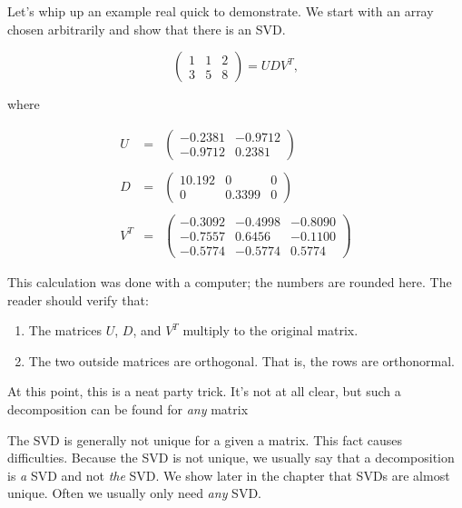 \documentclass{amsbook}
\begin{document}
\begin{tcolorbox}[title=Example,colback=blue!5]
Let's whip up an example real quick to demonstrate.  We start with an array chosen arbitrarily and show that there is an SVD.

$$
\left(
\begin{array}{ccc}
1 & 1 & 2 \\ 3 & 5 & 8
\end{array}
\right) = UDV^T,
$$

where

$$
\begin{array}{rcl}
U &=& \left(
\begin{array}{cc}
-0.2381 & -0.9712 \\
-0.9712 & 0.2381
\end{array}
\right)\\
\\
D&=&\left(
\begin{array}{ccc}
10.192 & 0 & 0 \\
0 & 0.3399 & 0
\end{array}
\right)\\
\\
V^T&=&\left(
\begin{array}{ccc}
-0.3092 & -0.4998 & -0.8090 \\
-0.7557 & 0.6456 & -0.1100 \\
-0.5774 & -0.5774 & 0.5774
\end{array}
\right)
\end{array}
$$
 
This calculation was done with a computer; the numbers are rounded here.  The reader should verify that:

\begin{enumerate}
\item The matrices $U$, $D$, and $V^T$ multiply to the original matrix.
\item The two outside matrices are orthogonal.  That is, the rows are orthonormal.
\end{enumerate}

At this point, this is a neat party trick.  It's not at all clear, but such a decomposition can be found for {\em any} matrix
\end{tcolorbox}

The SVD is generally not unique for a given a matrix.  This fact causes difficulties.  Because the SVD is not unique, we usually say that a decomposition is {\em a} SVD and not {\em the} SVD.  We show later in the chapter that SVDs are almost unique.  Often we usually only need {\em any} SVD.
\end{document}
